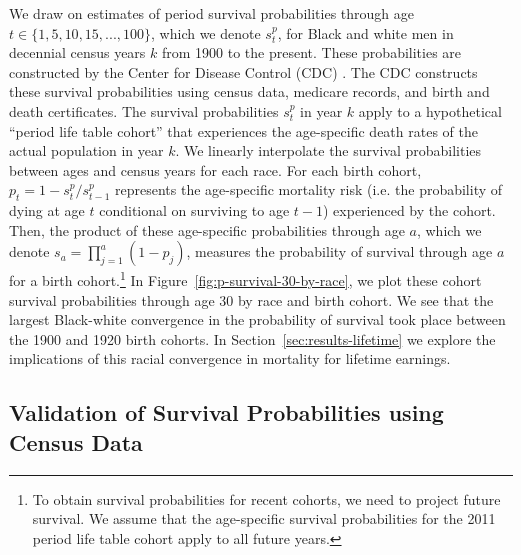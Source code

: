 \documentclass[12pt]{article}
\begin{document}
We draw on estimates of period survival probabilities through age $t \in \{1,5,10,15,...,100\}$, which we denote $s_t^p$, for Black and white men in decennial census years $k$ from 1900 to the present. 
These probabilities are constructed by the Center for Disease Control (CDC) \citep[Table 20 in][]{arias_united_2015}.
The CDC constructs these survival probabilities using census data, medicare records, and birth and death certificates. 
The survival probabilities $s_t^p$ in year $k$ apply to a hypothetical ``period life table cohort'' that experiences the age-specific death rates of the actual population in year $k$.
We linearly interpolate the survival probabilities between ages and census years for each race.
For each birth cohort, $p_t = 1 - s_t^p/s_{t-1}^p$ represents the age-specific mortality risk  (i.e. the probability of dying at age $t$ conditional on surviving to age $t-1$) experienced by the cohort. 
Then, the product of these age-specific probabilities through age $a$, which we denote $s_a = \prod\limits_{j=1}^{a}(1-p_j)$, measures the probability of survival through age $a$ for a birth cohort.\footnote{To obtain survival probabilities for recent cohorts, we need to project future survival. 
We assume that the age-specific survival probabilities for the 2011 period life table cohort apply to all future years.} 
In Figure~\ref{fig:p-survival-30-by-race}, we plot these cohort survival probabilities through age 30 by race and birth cohort. 
We see that the largest Black-white convergence in the probability of survival took place between the 1900 and 1920 birth cohorts.
In Section~\ref{sec:results-lifetime} we explore the implications of this racial convergence in mortality for lifetime earnings. 

\subsection{Validation of Survival Probabilities using Census Data}
\end{document}
